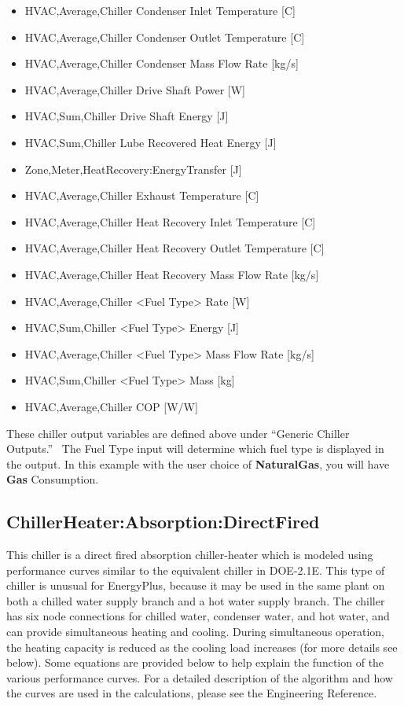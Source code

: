 \begin{itemize}
    \item
    HVAC,Average,Chiller Condenser Inlet Temperature {[}C{]}
    \item
    HVAC,Average,Chiller Condenser Outlet Temperature {[}C{]}
    \item
    HVAC,Average,Chiller Condenser Mass Flow Rate {[}kg/s{]}
    \item
    HVAC,Average,Chiller Drive Shaft Power {[}W{]}
    \item
    HVAC,Sum,Chiller Drive Shaft Energy {[}J{]}
    \item
    HVAC,Sum,Chiller Lube Recovered Heat Energy {[}J{]}
    \item
    Zone,Meter,HeatRecovery:EnergyTransfer {[}J{]}
    \item
    HVAC,Average,Chiller Exhaust Temperature {[}C{]}
    \item
    HVAC,Average,Chiller Heat Recovery Inlet Temperature {[}C{]}
    \item
    HVAC,Average,Chiller Heat Recovery Outlet Temperature {[}C{]}
    \item
    HVAC,Average,Chiller Heat Recovery Mass Flow Rate {[}kg/s{]}
    \item
    HVAC,Average,Chiller \textless{}Fuel Type\textgreater{} Rate {[}W{]}
    \item
    HVAC,Sum,Chiller \textless{}Fuel Type\textgreater{} Energy {[}J{]}
    \item
    HVAC,Average,Chiller \textless{}Fuel Type\textgreater{} Mass Flow Rate {[}kg/s{]}
    \item
    HVAC,Sum,Chiller \textless{}Fuel Type\textgreater{} Mass {[}kg{]}
    \item
    HVAC,Average,Chiller COP {[}W/W{]}
\end{itemize}

These chiller output variables are defined above under ``Generic Chiller Outputs.''~ The Fuel Type input will determine which fuel type is displayed in the output. In this example with the user choice of \textbf{NaturalGas}, you will have \textbf{Gas} Consumption.

\subsection{ChillerHeater:Absorption:DirectFired}\label{chillerheaterabsorptiondirectfired}

This chiller is a direct fired absorption chiller-heater which is modeled using performance curves similar to the equivalent chiller in DOE-2.1E. This type of chiller is unusual for EnergyPlus, because it may be used in the same plant on both a chilled water supply branch and a hot water supply branch. The chiller has six node connections for chilled water, condenser water, and hot water, and can provide simultaneous heating and cooling. During simultaneous operation, the heating capacity is reduced as the cooling load increases (for more details see below). Some equations are provided below to help explain the function of the various performance curves. For a detailed description of the algorithm and how the curves are used in the calculations, please see the Engineering Reference.

